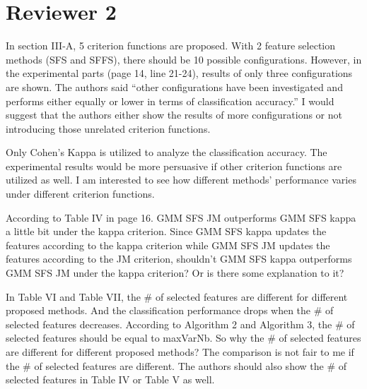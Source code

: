 \documentclass[a4paper,10pt,DIV=16]{scrartcl}
\begin{document}
\section{Reviewer 2}
\begin{revbox}
  In section III-A, 5 criterion functions are proposed. With 2 feature selection methods (SFS and SFFS), there should be 10 possible configurations. However, in the experimental parts (page 14, line 21-24), results of only three configurations are shown. The authors said “other configurations have been investigated and performs either equally or lower in terms of classification accuracy.” I would suggest that the authors either show the results of more configurations or not introducing those unrelated criterion functions.
  \begin{resbox}

  \end{resbox}
\end{revbox}

\begin{revbox}
  Only Cohen’s Kappa is utilized to analyze the classification accuracy. The experimental results would be more persuasive if other criterion functions are utilized as well. I am interested to see how different methods’ performance varies under different criterion functions.
  \begin{resbox}

  \end{resbox}
\end{revbox}

\begin{revbox}
  According to Table IV in page 16. GMM SFS JM outperforms GMM SFS kappa a little bit under the kappa criterion. Since GMM SFS kappa updates the features according to the kappa criterion while GMM SFS JM updates the features according to the JM criterion, shouldn’t GMM SFS kappa outperforms GMM SFS JM under the kappa criterion? Or is there some explanation to it?
  \begin{resbox}

  \end{resbox}
\end{revbox}

\begin{revbox}
  In Table VI and Table VII, the \# of selected features are different for different proposed methods. And the classification performance drops when the \# of selected features decreases. According to Algorithm 2 and Algorithm 3, the \# of selected features should be equal to maxVarNb. So why the \# of selected features are different for different proposed methods? The comparison is not fair to me if the \# of selected features are different. The authors should also show the \# of selected features in Table IV or Table V as well.
  \begin{resbox}

  \end{resbox}
\end{revbox}
\end{document}
